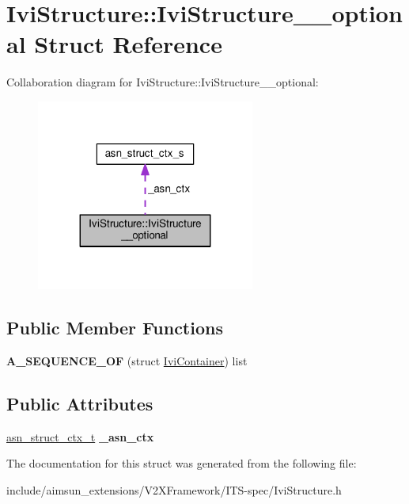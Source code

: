 \hypertarget{structIviStructure_1_1IviStructure____optional}{}\section{Ivi\+Structure\+:\+:Ivi\+Structure\+\_\+\+\_\+optional Struct Reference}
\label{structIviStructure_1_1IviStructure____optional}


Collaboration diagram for Ivi\+Structure\+:\+:Ivi\+Structure\+\_\+\+\_\+optional\+:\nopagebreak
\begin{figure}[H]
\begin{center}
\leavevmode
\includegraphics[width=203pt]{structIviStructure_1_1IviStructure____optional__coll__graph}
\end{center}
\end{figure}
\subsection*{Public Member Functions}
\begin{DoxyCompactItemize}
\item 
{\bfseries A\+\_\+\+S\+E\+Q\+U\+E\+N\+C\+E\+\_\+\+OF} (struct \hyperlink{structIviContainer}{Ivi\+Container}) list\hypertarget{structIviStructure_1_1IviStructure____optional_ace203dbab331ed0b75865c170a78b591}{}\label{structIviStructure_1_1IviStructure____optional_ace203dbab331ed0b75865c170a78b591}

\end{DoxyCompactItemize}
\subsection*{Public Attributes}
\begin{DoxyCompactItemize}
\item 
\hyperlink{structasn__struct__ctx__s}{asn\+\_\+struct\+\_\+ctx\+\_\+t} {\bfseries \+\_\+asn\+\_\+ctx}\hypertarget{structIviStructure_1_1IviStructure____optional_a978d0b6d5975365cfd355d205ae35728}{}\label{structIviStructure_1_1IviStructure____optional_a978d0b6d5975365cfd355d205ae35728}

\end{DoxyCompactItemize}


The documentation for this struct was generated from the following file\+:\begin{DoxyCompactItemize}
\item 
include/aimsun\+\_\+extensions/\+V2\+X\+Framework/\+I\+T\+S-\/spec/Ivi\+Structure.\+h\end{DoxyCompactItemize}
